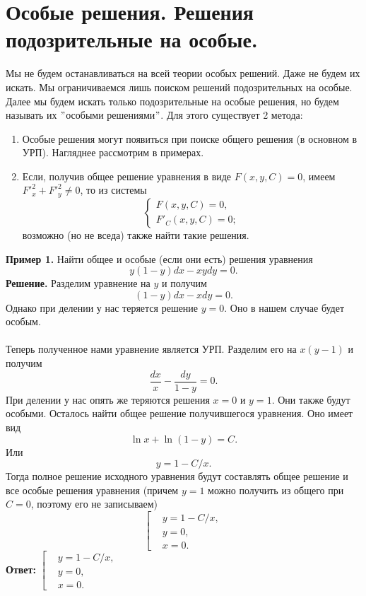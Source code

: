 \documentclass[a4paper, 12pt]{article}
\begin{document}
 
	\section*{Особые решения. Решения подозрительные на особые.}
	Мы не будем останавливаться на всей теории особых решений. Даже не будем их искать. Мы ограничиваемся лишь поиском решений подозрительных на особые. Далее мы будем искать только подозрительные на особые решения, но будем называть их $"$особыми решениями$"$. Для этого существует 2 метода:\begin{enumerate}
		\item Особые решения могут появиться при поиске общего решения (в основном в УРП). Нагляднее рассмотрим в примерах.
		\item Если, получив общее решение уравнения в виде $F(x,y,C) = 0$, имеем $F'^2_x + F'^2_y \ne 0$, то из системы $$\begin{cases}
			F(x,y,C) = 0,\\
			F'_C(x,y,C) = 0;
		\end{cases}$$ возможно (но не вседа) также найти такие решения.
	\end{enumerate}
\textbf{Пример 1.} Найти общее и особые (если они есть) решения уравнения $$y(1-y)dx - xydy = 0.$$
\textbf{Решение.} Разделим уравнение на $y$ и получим $$(1-y)dx - xdy = 0.$$ Однако при делении у нас теряется решение $y = 0$. Оно в нашем случае будет особым.\\\\
Теперь полученное нами уравнение является УРП. Разделим его на $x(y-1)$ и получим $$\dfrac{dx}{x} - \dfrac{dy}{1-y} = 0.$$
При делении у нас опять же теряются решения $x = 0$ и $y = 1$. Они также будут особыми. Осталось найти общее решение получившегося уравнения. Оно имеет вид $$\ln x + \ln (1-y) = C.$$ Или $$y = 1-C/x.$$
Тогда полное решение исходного уравнения будут составлять общее решение и все особые решения уравнения (причем $y=1$ можно получить из общего при $C= 0$, поэтому его не записываем) $$\left[\begin{aligned}
	&y = 1-C/x,\\
	&y = 0,\\
	&x = 0.
\end{aligned}\right.$$
\textbf{Ответ:} $\left[\begin{aligned}
	&y = 1-C/x,\\
	&y = 0,\\
	&x = 0.
\end{aligned}\right.$\\\\
\end{document}
